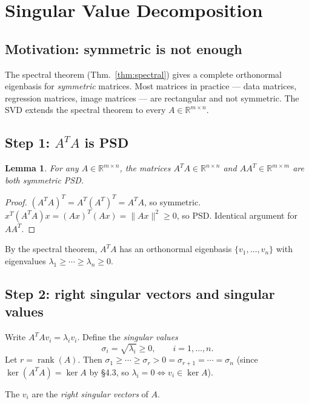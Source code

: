 \documentclass[11pt]{article}
\theoremstyle{definition}
\theoremstyle{plain}
\newtheorem{lemma}{Lemma}[section]
\begin{document}
\section{Singular Value Decomposition}

\subsection{Motivation: symmetric is not enough}

The spectral theorem (Thm.~\ref{thm:spectral}) gives a complete
orthonormal eigenbasis for \emph{symmetric} matrices.  Most matrices in
practice --- data matrices, regression matrices, image matrices --- are
rectangular and not symmetric.  The SVD extends the spectral theorem to
every $A\in\mathbb{R}^{m\times n}$.

\subsection{Step 1: $A^TA$ is PSD}

\begin{lemma}
  For any $A\in\mathbb{R}^{m\times n}$, the matrices $A^TA\in\mathbb{R}^{n\times n}$
  and $AA^T\in\mathbb{R}^{m\times m}$ are both symmetric PSD.
\end{lemma}
\begin{proof}
  $(A^TA)^T = A^T(A^T)^T = A^TA$, so symmetric.
  $x^T(A^TA)x = (Ax)^T(Ax) = \|Ax\|^2 \ge 0$, so PSD.
  Identical argument for $AA^T$.
\end{proof}

\noindent
By the spectral theorem, $A^TA$ has an orthonormal eigenbasis
$\{v_1,\ldots,v_n\}$ with eigenvalues $\lambda_1 \ge \cdots \ge \lambda_n \ge 0$.

\subsection{Step 2: right singular vectors and singular values}

Write $A^TAv_i = \lambda_i v_i$.  Define the \emph{singular values}
\[
  \sigma_i = \sqrt{\lambda_i} \ge 0, \qquad i = 1,\ldots,n.
\]
Let $r = \operatorname{rank}(A)$.  Then $\sigma_1 \ge \cdots \ge \sigma_r > 0 =
\sigma_{r+1} = \cdots = \sigma_n$ (since $\ker(A^TA) = \ker A$ by \S4.3,
so $\lambda_i = 0 \Leftrightarrow v_i \in \ker A$).

The $v_i$ are the \emph{right singular vectors} of $A$.
\end{document}
